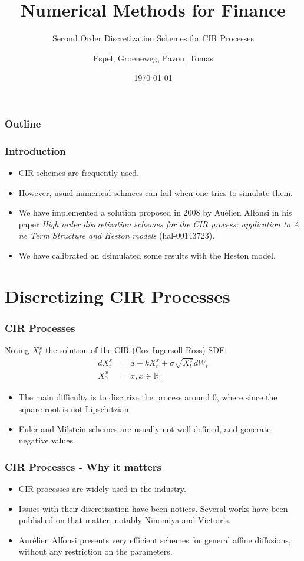 \documentclass[12pt]{beamer}
\title{Numerical Methods for Finance}
\subtitle{Second Order Discretization Schemes for CIR Processes}
\author{Espel, Groeneweg, Pavon, Tomas}
\institute{Imperial College London}
\date{\today}
\begin{document}
\begin{frame}
    \titlepage
\end{frame}


\begin{frame}
\frametitle{Outline}
\tableofcontents
\end{frame}

\begin{frame}
\frametitle{Introduction}
\begin{itemize}
  \item CIR schemes are frequently used.
  \item However, usual numerical schmees can fail when one tries to simulate them.
  \item We have implemented a solution proposed in 2008 by Auélien Alfonsi in his paper \textit{High order discretization schemes for the CIR process: application to A ne Term Structure and Heston models} (hal-00143723).
  \item We have calibrated an dsimulated some results with the Heston model.
\end{itemize}
\end{frame}


\section{Discretizing CIR Processes}
\frame{\tableofcontents[currentsection]}

\begin{frame}
\frametitle{CIR Processes}
Noting $X^{x}_{t}$ the solution of the CIR (Cox-Ingersoll-Ross) SDE:
\begin{align*}
dX^{x}_{t} & = a - kX^{x}_{t} + \sigma \sqrt{X^{x}_{t}} dW_{t} \\
X^{x}_{0} & = x, x \in \mathbb{R_{+}}
\end{align*}
\begin{itemize}
  \item The main difficulty is to disctrize the process around 0, where since the square root is not Lipschitzian.
  \item Euler and Milstein schemes are usually not well defined, and generate negative values.
\end{itemize}
\end{frame}

\begin{frame}
\frametitle{CIR Processes - Why it matters}
\begin{itemize}
  \item CIR processes are widely used in the industry.
  \item Issues with their discretization have been notices. Several works have been published on that matter, notably Ninomiya and Victoir's.
  \item Aurélien Alfonsi presents very efficient schemes for general affine diffusions, without any restriction on the parameters.
\end{itemize}
\end{frame}
\end{document}

